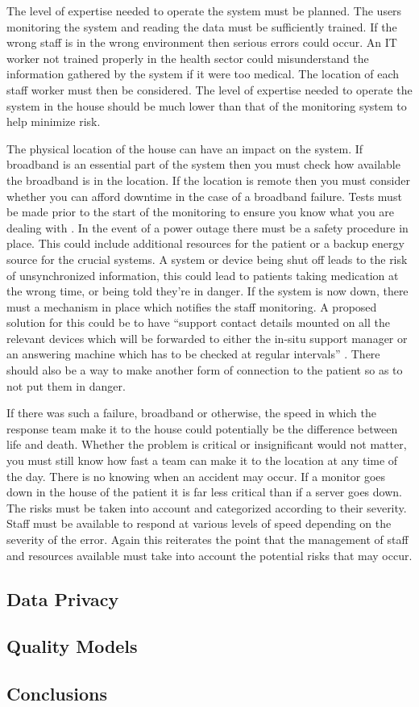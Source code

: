 The level of expertise needed to operate the system must be planned. The users monitoring the system and reading the data must be sufficiently trained. If the wrong staff is in the wrong environment then serious errors could occur. An IT worker not trained properly in the health sector could misunderstand the information gathered by the system if it were too medical. The location of each staff worker must then be considered. The level of expertise needed to operate the system in the house should be much lower than that of the monitoring system to help minimize risk.

The physical location of the house can have an impact on the system. If broadband is an essential part of the system then you must check how available the broadband is in the location. If the location is remote then you must consider whether you can afford downtime in the case of a broadband failure. Tests must be made prior to the start of the monitoring to ensure you know what you are dealing with \parencite{env}. In the event of a power outage there must be a safety procedure in place. This could include additional resources for the patient or a backup energy source for the crucial systems. A system or device being shut off leads to the risk of unsynchronized information, this could lead to patients taking medication at the wrong time, or being told they’re in danger. If the system is now down, there must a mechanism in place which notifies the staff monitoring. A proposed solution for this could be to have “support contact details mounted on all the relevant devices which will be forwarded to either the in-situ support manager or an answering machine which has to be checked at regular intervals” \parencite{env}. There should also be a way to make another form of connection to the patient so as to not put them in danger.

If there was such a failure, broadband or otherwise, the speed in which the response team make it to the house could potentially be the difference between life and death. Whether the problem is critical or insignificant would not matter, you must still know how fast a team can make it to the location at any time of the day. There is no knowing when an accident may occur. If a monitor goes down in the house of the patient it is far less critical than if a server goes down. The risks must be taken into account and categorized according to their severity. Staff must be available to respond at various levels of speed depending on the severity of the error. Again this reiterates the point that the management of staff and resources available must take into account the potential risks that may occur. 

\subsection{Data Privacy}

\subsection{Quality Models}

\subsection{Conclusions}